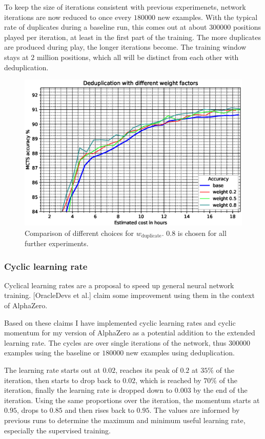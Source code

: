 \documentclass[12pt,onecolumn,oneside,titlepage]{article}
\begin{document}
To keep the size of iterations consistent with previous experimenets, network iterations are now reduced to once every $180000$ new examples. With the typical rate of duplicates during a baseline run, this comes out at about $300000$ positions played per iteration, at least in the first part
of the training. The more duplicates are produced during play, the longer iterations become.
The training window stays at $2$ million positions, which all will be distinct from each other with deduplication.

\begin{figure}[H]
\centering
\includegraphics[clip,width=\columnwidth]{dedupe}
\caption{Comparison of different choices for $w_{\text{duplicate}}$. $0.8$ is chosen for all further experiments.}
\label{fig:dedupe_cmp}
\end{figure}


\subsubsection{Cyclic learning rate}

Cyclical learning rates are a proposal \cite{smith2017cyclical} to speed up general neural network training. \cite{oracledevs6}[OracleDevs et al.] claim some improvement using them in the context of AlphaZero.

Based on these claims I have implemented cyclic learning rates and cyclic momentum for my version of AlphaZero as a potential addition to the extended learning rate. The cycles are over single iterations of the network, thus $300000$ examples 
using the baseline or $180000$ new examples using deduplication.

The learning rate starts out at $0.02$, reaches its peak of $0.2$ at $35\%$ of the iteration, then starts to drop back to $0.02$, which is reached by $70\%$ of the iteration, finally the learning rate is dropped down to $0.003$ by the end of the iteration.
Using the same proportions over the iteration, the momentum starts at $0.95$, drops to $0.85$ and then rises back to $0.95$.
The values are informed by previous runs to determine the maximum and minimum useful learning rate, especially the supervised training.
\end{document}
